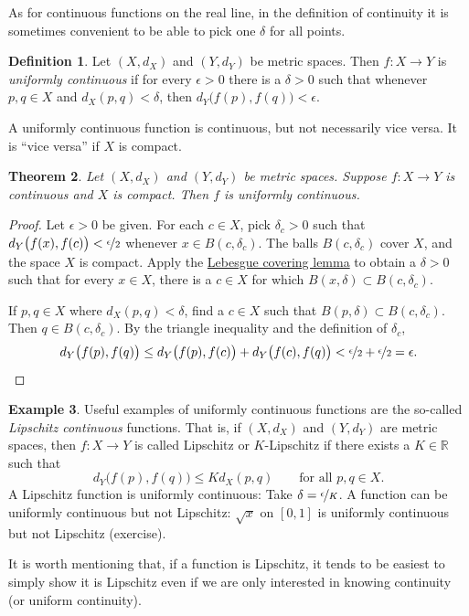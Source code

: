 \documentclass[12pt,openany]{book}
\newcommand{\R}{{\mathbb{R}}}
\newcommand{\myquote}[1]{``#1''}
\theoremstyle{plain}
\newtheorem{thm}{Theorem}[section]
\theoremstyle{remark}
\theoremstyle{definition}
\newtheorem{defn}[thm]{Definition}
\theoremstyle{exercise}
\theoremstyle{example}
\newtheorem{example}[thm]{Example}
\begin{document}
As for continuous
functions on the real line, in the definition of continuity
it is sometimes convenient to be able to pick
one $\delta$ for all points.

\begin{defn}
Let $(X,d_X)$ and $(Y,d_Y)$ be metric spaces.
Then $f \colon X \to Y$ is
\emph{uniformly continuous}
if for every $\epsilon > 0$
there is a $\delta > 0$ such that whenever $p,q \in X$ and $d_X(p,q) <
\delta$, then
$d_Y\bigl(f(p),f(q)\bigr) < \epsilon$.
\end{defn}

A uniformly continuous function is continuous, but not necessarily
vice versa.  It is \myquote{vice versa} if $X$ is compact.

\begin{thm} \label{thm:Xcompactfunifcont}
Let $(X,d_X)$ and $(Y,d_Y)$ be metric spaces.
Suppose $f \colon X \to Y$ is continuous and $X$ is compact.  Then
$f$ is uniformly continuous.
\end{thm}

\begin{proof}
Let $\epsilon > 0$ be given.  For each $c \in X$, pick $\delta_c > 0$ such that
$d_Y\bigl(f(x),f(c)\bigr) < \nicefrac{\epsilon}{2}$
whenever
$x \in B(c,\delta_c)$.
The balls
$B(c,\delta_c)$ cover $X$, and the space $X$ is compact.  
Apply the \hyperref[ms:lebesgue]{Lebesgue covering lemma} to obtain a 
$\delta > 0$ such that for every $x \in X$, there is a $c \in X$
for which $B(x,\delta) \subset B(c,\delta_c)$.

If $p, q \in X$ where $d_X(p,q) < \delta$,
find a $c \in X$ such that $B(p,\delta) \subset B(c,\delta_c)$.
Then $q \in B(c,\delta_c)$.  By the triangle inequality
and the definition of $\delta_c$,
\begin{equation*}
d_Y\bigl(f(p),f(q)\bigr)
\leq
d_Y\bigl(f(p),f(c)\bigr)
+
d_Y\bigl(f(c),f(q)\bigr)
<
\nicefrac{\epsilon}{2}+
\nicefrac{\epsilon}{2} = \epsilon .  \qedhere
\end{equation*}
\end{proof}


\begin{example}
Useful examples of uniformly continuous functions are the so-called
\emph{Lipschitz continuous}%
%
functions.  That is, if
$(X,d_X)$ and $(Y,d_Y)$ are metric spaces, then $f \colon X \to Y$
is called Lipschitz or $K$-Lipschitz if there exists a $K \in \R$ such that
\begin{equation*}
d_Y\bigl(f(p),f(q)\bigr) \leq K d_X(p,q)
\qquad \text{for all } p,q \in X.
\end{equation*}
A Lipschitz function is uniformly continuous:
Take $\delta = \nicefrac{\epsilon}{K}$.
A function can be uniformly continuous
but not Lipschitz:
$\sqrt{x}$ on $[0,1]$
is uniformly continuous but not Lipschitz (exercise).

It is worth mentioning that,
if a function is Lipschitz, it tends to be
easiest to simply show it is Lipschitz even if we are only
interested in knowing continuity (or uniform continuity).
\end{example}
\end{document}
